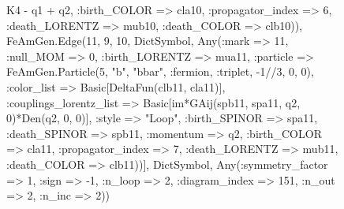 \documentclass{revtex4}
\begin{document}
\begin{figure}[!htb]
\begin{center}
{K4 - q1 + q2, :birth_COLOR => cla10, :propagator_index => 6, :death_LORENTZ => mub10, :death_COLOR => clb10)), FeAmGen.Edge(11, 9, 10, Dict{Symbol, Any}(:mark => 11, :null_MOM => 0, :birth_LORENTZ => mua11, :particle => FeAmGen.Particle(5, "b", "bbar", :fermion, :triplet, -1//3, 0, 0), :color_list => Basic[DeltaFun(clb11, cla11)], :couplings_lorentz_list => Basic[im*GAij(spb11, spa11, q2, 0)*Den(q2, 0, 0)], :style => "Loop", :birth_SPINOR => spa11, :death_SPINOR => spb11, :momentum => q2, :birth_COLOR => cla11, :propagator_index => 7, :death_LORENTZ => mub11, :death_COLOR => clb11))], Dict{Symbol, Any}(:symmetry_factor => 1, :sign => -1, :n_loop => 2, :diagram_index => 151, :n_out => 2, :n_inc => 2)) 
}
\end{center}
\end{figure}
\end{document}

